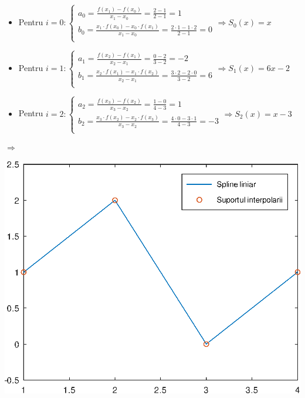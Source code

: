 \documentclass{article}
\begin{document}
\begin{minipage}{0.75\textwidth}
    \begin{itemize}
    \item Pentru $i = 0: \begin{cases}
      a_0 = \frac{f(x_1) - f(x_0)}{x_1 - x_0} = \frac{2 - 1}{2 - 1} = 1\\
      b_0 = \frac{x_1 \cdot f(x_0) - x_0 \cdot f(x_1)}{x_1 - x_0} = \frac{2\cdot1 - 1\cdot2}{2 - 1} = 0\\
    \end{cases} \Rightarrow S_0(x) = x$
    \item Pentru $i = 1: \begin{cases}
      a_1 = \frac{f(x_2) - f(x_1)}{x_2 - x_1} = \frac{0 - 2}{3 - 2}  = -2\\
      b_1 = \frac{x_2 \cdot f(x_1) - x_1 \cdot f(x_2)}{x_2 - x_1} = \frac{3\cdot2 - 2\cdot0}{3-2} = 6\\
    \end{cases} \Rightarrow S_1(x) = 6x - 2$
    \item Pentru $i = 2: \begin{cases}
      a_2 = \frac{f(x_3) - f(x_2)}{x_3 - x_2} = \frac{1 - 0}{4 - 3} = 1\\
      b_2 = \frac{x_3 \cdot f(x_2) - x_2 \cdot f(x_3)}{x_3 - x_2} = \frac{4\cdot0 -3\cdot1}{4 - 3} = -3\\
    \end{cases} \Rightarrow S_2(x) = x - 3$
    \end{itemize}
\end{minipage}
\begin{minipage}{0.5\textwidth}
    $\Longrightarrow$ 
\end{minipage}

\begin{center}
    \includegraphics[scale=0.5]{liniara_ex}
\end{center}
\end{document}
